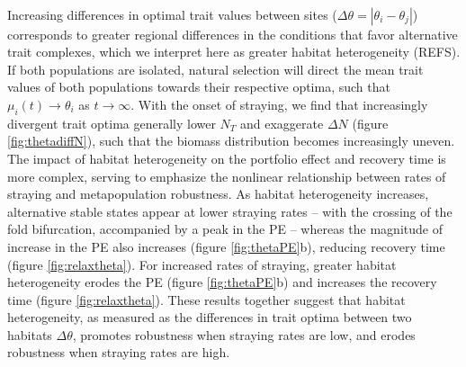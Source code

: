 \documentclass[twocolumn,preprintnumbers,amsmath,amssymb,superscriptaddress]{revtex4}
\begin{document}
\\ 
\noindent Increasing differences in optimal trait values between sites ($\Delta\theta = \left|\theta_i - \theta_j\right|$) corresponds to greater regional differences in the conditions that favor alternative trait complexes, which we interpret here as greater habitat heterogeneity (REFS).
If both populations are isolated, natural selection will direct the mean trait values of both populations towards their respective optima, such that $\mu_i(t) \rightarrow \theta_i$ as $t\rightarrow\infty$.
With the onset of straying, we find that increasingly divergent trait optima generally lower $N_T$ and exaggerate $\Delta N$ (figure \ref{fig:thetadiffN}), such that the biomass distribution becomes increasingly uneven. %
The impact of habitat heterogeneity on the portfolio effect and recovery time is more complex, serving to emphasize the nonlinear relationship between rates of straying and metapopulation robustness. %
As habitat heterogeneity increases, alternative stable states appear at lower straying rates -- with the crossing of the fold bifurcation, accompanied by a peak in the PE -- whereas the magnitude of increase in the PE also increases (figure \ref{fig:thetaPE}b), reducing recovery time (figure \ref{fig:relaxtheta}).
For increased rates of straying, greater habitat heterogeneity erodes the PE (figure \ref{fig:thetaPE}b) and increases the recovery time (figure \ref{fig:relaxtheta}).
These results together suggest that habitat heterogeneity, as measured as the differences in trait optima between two habitats $\Delta\theta$, promotes robustness when straying rates are low, and erodes robustness when straying rates are high.
\end{document}

